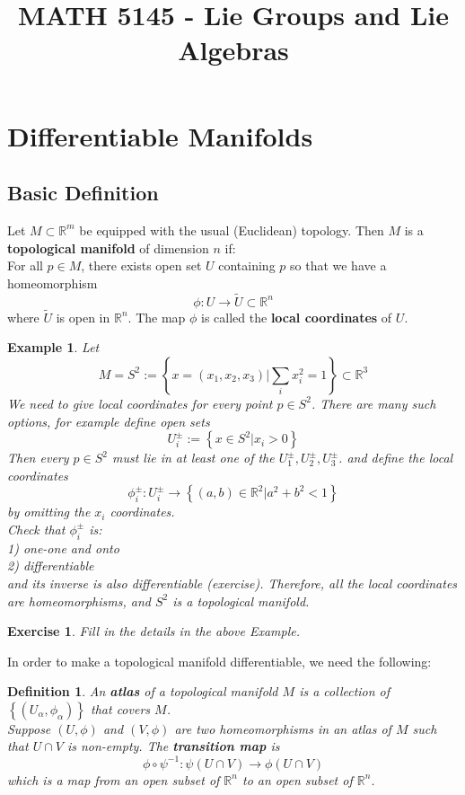 \documentclass[11pt]{article}
\title{MATH 5145 - Lie Groups and Lie Algebras}
\date{}
\newtheorem{example}[theorem]{Example}
\newtheorem{exercise}[theorem]{Exercise}
\newtheorem{definition}[theorem]{Definition}
\newcommand{\bb}[1]{\mathbb{#1}}
\begin{document}
\maketitle
\tableofcontents

\newpage
\section{Differentiable Manifolds}
\subsection{Basic Definition}
Let $M \subset \bb{R}^m$ be equipped with the usual (Euclidean) topology. Then $M$ is a \textbf{topological manifold} of dimension $n$ if:\\

For all $p \in M$, there exists open set $U$ containing $p$ so that we have a homeomorphism
$$\phi: U \to \tilde{U} \subset \bb{R}^n$$
where $\tilde{U}$ is open in $\bb{R}^n$. The map $\phi$ is called the \textbf{local coordinates} of $U$.
\begin{example}
Let
$$M  = S^2 := \left\{ x = (x_1, x_2, x_3) | \sum_i x_i^2 = 1 \right\} \subset \bb{R}^3$$
We need to give local coordinates for every point $p \in S^2$. There are many such options, for example define open sets
$$U_i^{\pm} := \left\{ x \in S^2 | x_i > 0 \right\}$$
Then every $p \in S^2$ must lie in at least one of the $U_1^{\pm}, U_2^{\pm}, U_3^{\pm}$.
and define the local coordinates
$$\phi_i^{\pm} : U_i^{\pm} \to \left\{(a,b) \in \bb{R}^2 | a^2 + b^2 < 1 \right\}$$
by omitting the $x_i$ coordinates.\\
Check that $\phi_i^{\pm}$ is:\\
1) one-one and onto\\
2) differentiable\\
and its inverse is also differentiable (exercise). Therefore, all the local coordinates are homeomorphisms, and $S^2$ is a topological manifold.
\end{example}
\begin{exercise}
Fill in the details in the above Example.
\end{exercise}
In order to make a topological manifold differentiable, we need the following:
\begin{definition}
An \textbf{atlas} of a topological manifold $M$ is a collection of $\left\{(U_{\alpha}, \phi_{\alpha})\right\}$ that covers $M$.\\
Suppose $(U,\phi)$ and $(V,\phi)$ are two homeomorphisms in an atlas of $M$ such that $U \cap V$ is non-empty. The \textbf{transition map} is
$$ \phi \circ \psi^{-1} : \psi(U \cap V) \to \phi(U \cap V)$$
which is a map from an open subset of $\bb{R}^n$ to an open subset of $\bb{R}^n$.
\end{definition}
\end{document}
